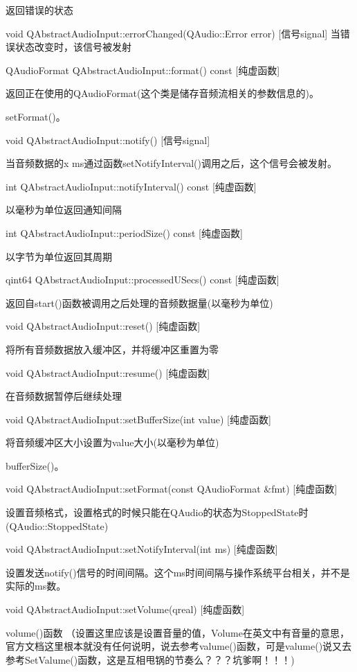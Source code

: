 返回错误的状态

void QAbstractAudioInput::errorChanged(QAudio::Error error) [信号signal]
当错误状态改变时，该信号被发射

QAudioFormat QAbstractAudioInput::format() const [纯虚函数]

返回正在使用的QAudioFormat(这个类是储存音频流相关的参数信息的)。

\begin{notice}[另请参阅]
setFormat()。
\end{notice}

void QAbstractAudioInput::notify() [信号signal]

当音频数据的x ms通过函数setNotifyInterval()调用之后，这个信号会被发射。

int QAbstractAudioInput::notifyInterval() const [纯虚函数]

以毫秒为单位返回通知间隔

int QAbstractAudioInput::periodSize() const [纯虚函数]

以字节为单位返回其周期

qint64 QAbstractAudioInput::processedUSecs() const [纯虚函数]

返回自start()函数被调用之后处理的音频数据量(以毫秒为单位)

void QAbstractAudioInput::reset() [纯虚函数]

将所有音频数据放入缓冲区，并将缓冲区重置为零

void QAbstractAudioInput::resume() [纯虚函数]

在音频数据暂停后继续处理

void QAbstractAudioInput::setBufferSize(int value) [纯虚函数]

将音频缓冲区大小设置为value大小(以毫秒为单位) 

\begin{notice}[另请参阅]
bufferSize()。
\end{notice}

void QAbstractAudioInput::setFormat(const QAudioFormat \&fmt) [纯虚函数]

设置音频格式，设置格式的时候只能在QAudio的状态为StoppedState时(QAudio::StoppedState)

void QAbstractAudioInput::setNotifyInterval(int ms) [纯虚函数]

设置发送notify()信号的时间间隔。这个ms时间间隔与操作系统平台相关，并不是实际的ms数。

void QAbstractAudioInput::setVolume(qreal) [纯虚函数]

\begin{notice}[另请参阅]
volume()函数 （设置这里应该是设置音量的值，Volume在英文中有音量的意思，官方文档这里根本就没有任何说明，说去参考valume()函数，可是valume()说又去参考SetValume()函数，这是互相甩锅的节奏么？？？坑爹啊！！！)
\end{notice}

